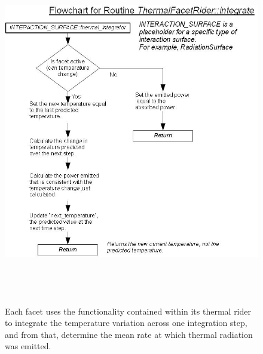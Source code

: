 \begin{figure}[htp]
\begin{center}
\includegraphics[height=6in]{figures/flow_chart_tfr_integrate.jpg}
\caption{Each facet uses the functionality contained within its 
thermal rider to integrate the temperature variation across one
integration step, and from that, determine the mean rate at which
thermal radiation was emitted.}
\label{fig:thermalflowchart5}
\end{center}
\end{figure}

